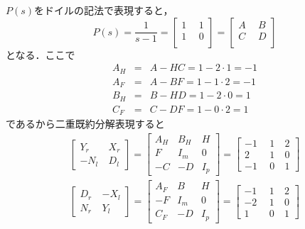 \documentclass[a4paper,12pt]{jarticle}
\begin{document}
\vspace{-10mm}
\section*{}
$P(s)$をドイルの記法で表現すると，
%
\begin{equation}
 P(s)=\frac{1}{s-1}=
\left[
  \begin{array}{c|c}
   1 ~&~ 1  \\ \hline
   1 ~&~ 0   \\ 
  \end{array}
  \right]
=
\left[
  \begin{array}{c|c}
   A ~&~ B  \\ \hline
   C ~&~ D   \\ 
  \end{array}
  \right]
\end{equation}
%
となる．ここで
%
\begin{eqnarray}
 A_H&=&A-HC=1-2\cdot1=-1\\
 A_F&=&A-BF=1-1\cdot2=-1\\
 B_H&=&B-HD=1-2\cdot0=1\\
 C_F&=&C-DF=1-0\cdot2=1
\end{eqnarray}
%
であるから二重既約分解表現すると
%
\begin{eqnarray}
\left[
  \begin{array}{c|c}
   Y_r ~&~ X_r  \\ \hline
   -N_l &~ D_l   
  \end{array}
\right]
=
\left[
  \begin{array}{c|cc}
  A_H & B_H  & H  \\ \hline
  F   &  I_m & 0  \\
  -C  & -D   & I_p
  \end{array}
\right]
=
\left[
  \begin{array}{c|cc}
  -1  ~&~ 1 ~& 2  \\ \hline
  2  ~&~ 1 ~& 0  \\
  -1  ~&~ 0 ~& 1
  \end{array}
  \right]
\\
\left[
  \begin{array}{c|c}
   D_r ~& -X_l  \\ \hline
   N_r ~& Y_l   
  \end{array}
\right]
=
\left[
  \begin{array}{c|cc}
  A_F & B    & H  \\ \hline
  -F  &  I_m & 0  \\
  C_F & -D   & I_p
  \end{array}
\right]
=
\left[
  \begin{array}{c|cc}
  -1  ~&~ 1 ~& 2  \\ \hline
  -2  ~&~ 1 ~& 0  \\
   1  ~&~ 0 ~& 1
  \end{array}
  \right]
\end{eqnarray}
\end{document}
